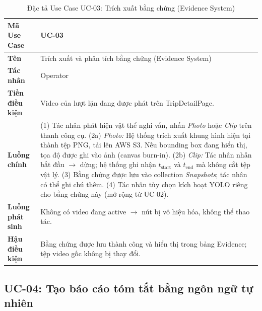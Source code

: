 \documentclass[../DoAn.tex]{subfiles}
\begin{document}
\begin{longtable}{|p{3.5cm}|p{10.0cm}|}
\caption{Đặc tả Use Case UC-03: Trích xuất bằng chứng (Evidence System)}\label{tab:uc03}\\
\hline
\textbf{Mã Use Case} & UC-03 \\
\hline
\textbf{Tên} & Trích xuất và phân tích bằng chứng (Evidence System) \\
\hline
\textbf{Tác nhân} & Operator \\
\hline
\textbf{Tiền điều kiện} & Video của lượt lặn đang được phát trên TripDetailPage. \\
\hline
\textbf{Luồng chính} &
(1) Tác nhân phát hiện vật thể nghi vấn, nhấn \textit{Photo} hoặc \textit{Clip} trên thanh công cụ. \newline
(2a) \textit{Photo:} Hệ thống trích xuất khung hình hiện tại thành tệp PNG, tải lên AWS S3. Nếu bounding box đang hiển thị, tọa độ được ghi vào ảnh (canvas burn-in). \newline
(2b) \textit{Clip:} Tác nhân nhấn bắt đầu $\to$ dừng; hệ thống ghi nhận $t_{\text{start}}$ và $t_{\text{end}}$ mà không cắt tệp vật lý. \newline
(3) Bằng chứng được lưu vào collection \textit{Snapshots}; tác nhân có thể ghi chú thêm. \newline
(4) Tác nhân tùy chọn kích hoạt YOLO riêng cho bằng chứng này (mở rộng từ UC-02). \\
\hline
\textbf{Luồng phát sinh} & Không có video đang active $\to$ nút bị vô hiệu hóa, không thể thao tác. \\
\hline
\textbf{Hậu điều kiện} & Bằng chứng được lưu thành công và hiển thị trong bảng Evidence; tệp video gốc không bị thay đổi. \\
\hline
\end{longtable}

\subsection{UC-04: Tạo báo cáo tóm tắt bằng ngôn ngữ tự nhiên}
\label{subsection:2.3.4}
\end{document}
